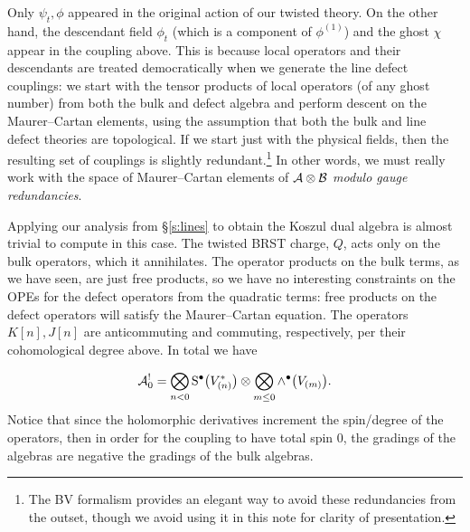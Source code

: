 \documentclass[11pt]{amsart}
\def\natalie#1{{\textcolor{green!65!black}{NMP: {#1}}}}
\begin{document}
Only $\psi_t, \phi$ appeared in the original action of our twisted theory. 
On the other hand, the descendant field $\phi_t$ (which is a component of $\phi^{(1)}$) and the ghost $\chi$ appear in the coupling above. 
This is because local operators and their descendants are treated democratically when we generate the line defect couplings: we start with the tensor products of local operators (of any ghost number) from both the bulk and defect algebra and perform descent on the Maurer--Cartan elements, using the assumption that both the bulk and line defect theories are topological. 
If we start just with the physical fields, then the resulting set of couplings is slightly redundant.\footnote{The BV formalism provides an elegant way to avoid these redundancies from the outset, though we avoid using it in this note for clarity of presentation.} 
In other words, we must really work with the space of Maurer--Cartan elements of $\mathcal A \otimes \mathcal B$ \textit{modulo gauge redundancies}.

Applying our analysis from \S \ref{s:lines} to obtain the Koszul dual algebra is almost trivial to compute in this case. 
The twisted BRST charge, $Q$, acts only on the bulk operators, which it annihilates. The operator products on the bulk terms, as we have seen, are just free products, so we have no interesting constraints on the OPEs for the defect operators from the quadratic terms: free products on the defect operators will satisfy the Maurer--Cartan equation. 
The operators $K[n], J[n]$ are anticommuting and commuting, respectively, per their cohomological degree above. In total we have

\begin{equation}\label{eq:freedual}
\mathcal{A}_0^{!} = \bigotimes_{n < 0} {\rm S}^\bullet \big(V^*_{(n)}\big) \otimes \bigotimes_{m \leq 0} \wedge^\bullet \big(V_{(m)}\big).
\end{equation} Notice that since the holomorphic derivatives increment the spin/degree of the operators, then in order for the coupling to have total spin 0, the gradings of the algebras are negative the gradings of the bulk algebras.

\end{document}
